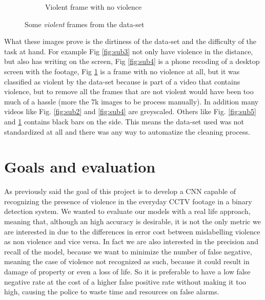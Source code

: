 \begin{figure}[]
\begin{subfigure}{.5\textwidth}
        \caption{Violent frame with no violence}
        \label{fig:sub6}
    \end{subfigure}
    \caption{Some \textit{violent} frames from the data-set}
    \label{fig:overall}
\end{figure}

What these images prove is the dirtiness of the data-set and the difficulty of the task at hand. For example Fig \ref{fig:sub3} not only have violence in the distance, but also has writing on the screen, Fig \ref{fig:sub4} is a phone recoding of a desktop screen with the footage, Fig \ref{fig:sub6} is a frame with no violence at all, but it was classified as violent by the data-set because is part of a video that contains violence, but to remove all the frames that are not violent would have been too much of a hassle (more the 7k images to be process manually). In addition many videos like Fig. \ref{fig:sub2} and \ref{fig:sub4} are greyscaled. Others like Fig. \ref{fig:sub5} and \ref{fig:sub6} contains black bars on the side. This means the data-set used was not standardized at all and there was any way to automatize the cleaning process.

\section{Goals and evaluation}
As previously said the goal of this project is to develop a CNN capable of recognizing the presence of violence in the everyday CCTV footage in a binary detection system. We wanted to evaluate our models with a real life approach, meaning that, although an high accuracy is desirable, it is not the only metric we are interested in due to the differences in error cost between mislabelling violence as non violence and vice versa. In fact we are also interested in the precision and recall of the model, because we want to minimize the number of false negative, meaning the case of violence not recognized as such, because it could result in damage of property or even a loss of life. So it is preferable to have a low false negative rate at the cost of a higher false positive rate without making it too high, causing the police to waste time and resources on false alarms. 